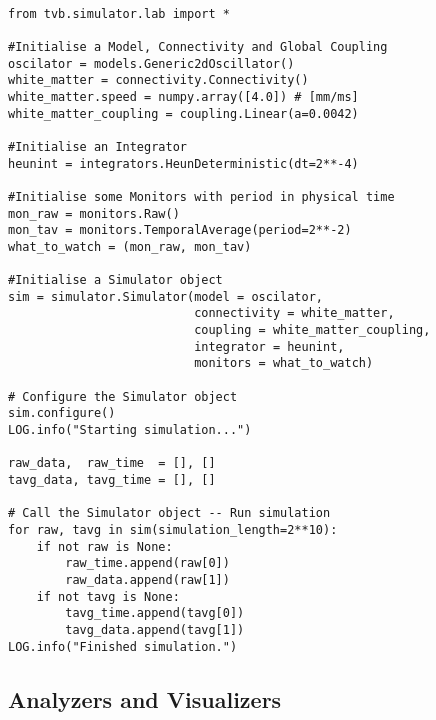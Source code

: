 \documentclass{bioinfo}
\begin{document}
\begin{methods}
    
\begin{lstlisting}[backgroundcolor=\color{black!5}, 
                   caption=Script example to simulate 1 second of brain 
                   activity. Output is recorded with two different monitors.\\,
                   commentstyle=\itshape\color{green!50!black},
                   frame=single,
                   keywordstyle={\bf\ttfamily\color{blue}},
                   label=code:region_deterministic,
                   showspaces=false,
                   showtabs=false]
    
from tvb.simulator.lab import *
        
#Initialise a Model, Connectivity and Global Coupling
oscilator = models.Generic2dOscillator()
white_matter = connectivity.Connectivity()
white_matter.speed = numpy.array([4.0]) # [mm/ms]
white_matter_coupling = coupling.Linear(a=0.0042)

#Initialise an Integrator
heunint = integrators.HeunDeterministic(dt=2**-4) 

#Initialise some Monitors with period in physical time
mon_raw = monitors.Raw()
mon_tav = monitors.TemporalAverage(period=2**-2)
what_to_watch = (mon_raw, mon_tav)

#Initialise a Simulator object
sim = simulator.Simulator(model = oscilator, 
                          connectivity = white_matter,
                          coupling = white_matter_coupling, 
                          integrator = heunint, 
                          monitors = what_to_watch)

# Configure the Simulator object
sim.configure()
LOG.info("Starting simulation...")
    
raw_data,  raw_time  = [], []
tavg_data, tavg_time = [], []
    
# Call the Simulator object -- Run simulation
for raw, tavg in sim(simulation_length=2**10):
    if not raw is None:
        raw_time.append(raw[0])
        raw_data.append(raw[1])
    if not tavg is None:
        tavg_time.append(tavg[0])
        tavg_data.append(tavg[1])
LOG.info("Finished simulation.")
\end{lstlisting}
 
    \subsection{Analyzers and Visualizers}
    

\end{methods}
\end{document}
